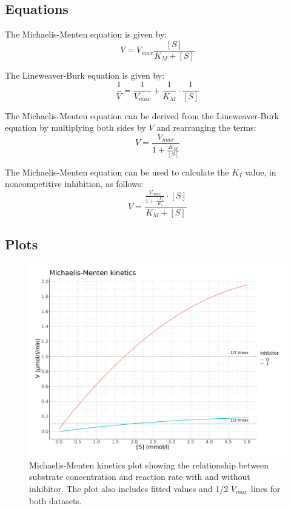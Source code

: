 \documentclass{article}
\begin{document}
\subsection*{Equations}

The Michaelis-Menten equation is given by:
\begin{equation}
    V = V_{max} \frac{[S]}{K_{M} + [S]}
\end{equation}

The Lineweaver-Burk equation is given by:
\begin{equation}
    \frac{1}{V} = \frac{1}{V_{max}} + \frac{1}{K_{M}} \cdot \frac{1}{[S]}
\end{equation}

The Michaelis-Menten equation can be derived from the Lineweaver-Burk equation by
multiplying both sides by $V$ and rearranging the terms:
\begin{equation}
    V = \frac{V_{max}}{\displaystyle 1 + \frac{K_{M}}{[S]}}
\end{equation}

The Michaelis-Menten equation can be used to calculate the $K_I$ value, in noncompetitive
inhibition, as follows: %
\begin{equation}
    V = \frac{\displaystyle \frac{V_{max}}{1 + \frac{[I]}{K_{I}}} \cdot [S]}{K_{M} + [S]}
\end{equation}

\subsection*{Plots}

\begin{figure}[H]
    \centering
    \includegraphics[width=1.0\textwidth, height=0.5\textheight]{plots/data_plot1.png}
    \caption{Michaelis-Menten kinetics plot showing the relationship
        between substrate concentration and reaction rate with and without inhibitor.
        The plot also includes fitted values and 1/2 $V_{max}$ lines for both datasets.}
    \label{fig:MMplot}
\end{figure}
\end{document}
